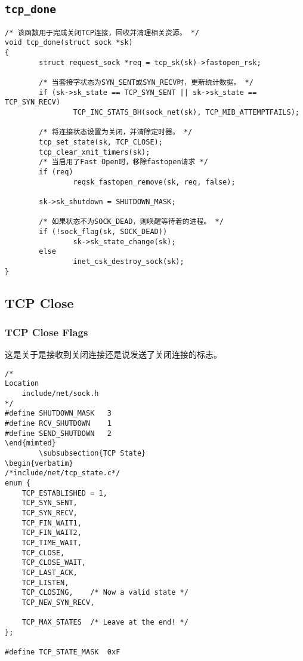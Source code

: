 \subsection{\texttt{tcp_done}}
\begin{verbatim}
/* 该函数用于完成关闭TCP连接，回收并清理相关资源。 */
void tcp_done(struct sock *sk)
{
        struct request_sock *req = tcp_sk(sk)->fastopen_rsk;

        /* 当套接字状态为SYN_SENT或SYN_RECV时，更新统计数据。 */
        if (sk->sk_state == TCP_SYN_SENT || sk->sk_state == TCP_SYN_RECV)
                TCP_INC_STATS_BH(sock_net(sk), TCP_MIB_ATTEMPTFAILS);

        /* 将连接状态设置为关闭，并清除定时器。 */
        tcp_set_state(sk, TCP_CLOSE);
        tcp_clear_xmit_timers(sk);
        /* 当启用了Fast Open时，移除fastopen请求 */
        if (req)
                reqsk_fastopen_remove(sk, req, false);

        sk->sk_shutdown = SHUTDOWN_MASK;

        /* 如果状态不为SOCK_DEAD，则唤醒等待着的进程。 */
        if (!sock_flag(sk, SOCK_DEAD))
                sk->sk_state_change(sk);
        else
                inet_csk_destroy_sock(sk);
}
\end{verbatim}



    \subsection{TCP Close}
        \subsubsection{TCP Close Flags}
            这是关于是接收到关闭连接还是说发送了关闭连接的标志。
\begin{verbatim}
/*
Location
    include/net/sock.h
*/
#define SHUTDOWN_MASK   3
#define RCV_SHUTDOWN    1
#define SEND_SHUTDOWN   2
\end{mimted}
        \subsubsection{TCP State}
\begin{verbatim}
/*include/net/tcp_state.c*/
enum {
    TCP_ESTABLISHED = 1,
    TCP_SYN_SENT,
    TCP_SYN_RECV,
    TCP_FIN_WAIT1,
    TCP_FIN_WAIT2,
    TCP_TIME_WAIT,
    TCP_CLOSE,
    TCP_CLOSE_WAIT,
    TCP_LAST_ACK,
    TCP_LISTEN,
    TCP_CLOSING,    /* Now a valid state */
    TCP_NEW_SYN_RECV,

    TCP_MAX_STATES  /* Leave at the end! */
};

#define TCP_STATE_MASK  0xF
\end{verbatim}

